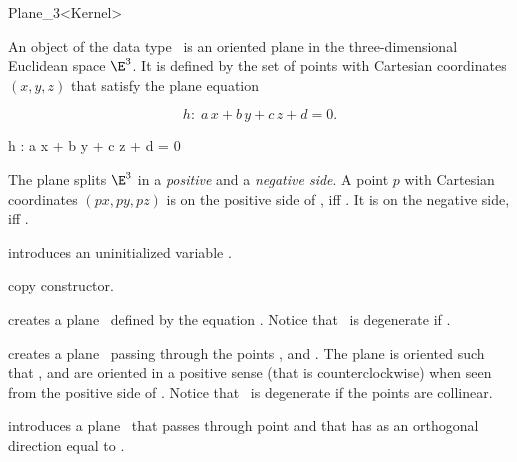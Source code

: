 \begin{ccRefClass} {Plane_3<Kernel>}

\ccDefinition 
An object  of the data type \ccRefName\ is an oriented
plane in the three-dimensional Euclidean space $\E^3$. It is defined
by the set of points with Cartesian coordinates $(x,y,z)$ that satisfy
the plane equation

\begin{ccTexOnly}
\[h :\;  a\, x +b\, y +c\, z + d = 0.\]
\end{ccTexOnly}
\begin{ccHtmlOnly}
h : a x + b y + c z + d = 0
\end{ccHtmlOnly}

The plane splits $\E^3$ in a {\em positive} and a {\em negative side}.
A point $p$ with Cartesian coordinates $(px, py, pz)$ is on the
positive side of , iff . It is on the negative side, iff
.

\ccCreation
{}

\ccHidden {}
             {introduces an uninitialized variable \ccVar.}

\ccHidden {}
            {copy constructor.}

{creates a plane \ccVar\ defined by the equation
 .
Notice that \ccVar\ is degenerate if .}

{creates a plane \ccVar\ passing through the points ,
  and . The plane is oriented such that , 
  and  are oriented in a positive sense 
 (that is counterclockwise) when seen from the positive side of \ccVar.
Notice that \ccVar\ is degenerate if the points are collinear.}


{introduces a plane \ccVar\ that passes through point  and
 that has as an orthogonal direction equal to .}


\end{ccRefClass}
